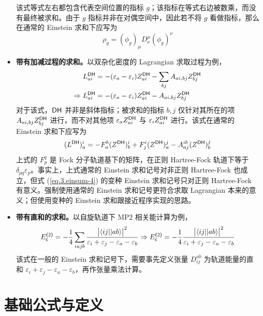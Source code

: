 \begin{itemize}[nosep]
该式等式左右都包含代表空间位置的指标 $g$；该指标在等式右边被数乘，而没有最终被求和。由于 $g$ 指标并非在对偶空间中，因此若不将 $g$ 看做指标，那么在通常的 Einstein 求和下应写为
\begin{equation*}
    \rho_g = (\phi_g)_\mu D^\mu_\nu (\phi_g)^\nu
\end{equation*}
\item \textbf{带有加减过程的求和。}以双杂化密度的 Lagrangian 求取过程为例，
\begin{align}
    \label{eq.3.einsum-4}
    L_{ai}^{\textsf{DH}} &= - (\varepsilon_a - \varepsilon_i) Z_{ai}^{\textsf{DH}} - \sum_{bj} A_{ai, bj} Z_{bj}^{\textsf{DH}} \notag\\
    \Rightarrow
    L_{ai}^{\textsf{DH}} &= - (\varepsilon_a - \varepsilon_i) Z_{ai}^{\textsf{DH}} - A_{ai, bj} Z_{bj}^{\textsf{DH}}
\end{align}
对于该式，$\textsf{DH}$ 并非是斜体指标；被求和的指标 $b, j$ 仅针对其所在的项 $A_{ai, bj} Z_{bj}^{\textsf{DH}}$ 进行，而不对其他项 $\varepsilon_a Z_{ai}^{\textsf{DH}}$ 与 $\varepsilon_i Z_{ai}^{\textsf{DH}}$ 进行。该式在通常的 Einstein 求和下应写为
\begin{equation*}
    (L^{\textsf{DH}})_a^i = - F_a^b (Z^{\textsf{DH}})_b^i + F_j^i (Z^{\textsf{DH}})_a^j - A_{aj}^{ib} (Z^{\textsf{DH}})_b^j
\end{equation*}
上式的 $F_p^q$ 是 Fock 分子轨道基下的矩阵，在正则 Hartree-Fock 轨道下等于 $\delta_{pq} \varepsilon_p$。事实上，上式通常的 Einstein 求和记号对非正则 Hartree-Fock 也成立，但式 (\ref{eq.3.einsum-4}) 的变种 Einstein 求和记号只对正则 Hartree-Fock 有意义。强制使用通常的 Einstein 求和记号更符合求取 Lagrangian 本来的意义；但使用变种的 Einstein 求和跟接近程序实现的思路。
\item \textbf{带有直和的求和。}以自旋轨道下 MP2 相关能计算为例，
\begin{equation}
    E_{\textsf{c}}^{\textsf{(2)}} = - \frac{1}{4} \sum_{iajb} \frac{\big| \langle i j || a b \rangle \big|^2}{\varepsilon_i + \varepsilon_j - \varepsilon_a - \varepsilon_b}
    \Rightarrow
    E_{\textsf{c}}^{\textsf{(2)}} = - \frac{1}{4} \frac{\big| \langle i j || a b \rangle \big|^2}{\varepsilon_i + \varepsilon_j - \varepsilon_a - \varepsilon_b}
\end{equation}
该式在一般的 Einstein 求和记号下，需要事先定义张量 $D_{ij}^{ab}$ 为轨道能量的直和 $\varepsilon_i + \varepsilon_j - \varepsilon_a - \varepsilon_b$，再作张量乘法计算。
\end{itemize}

\section{基础公式与定义}
\label{sec.3.basic-equation-def}

